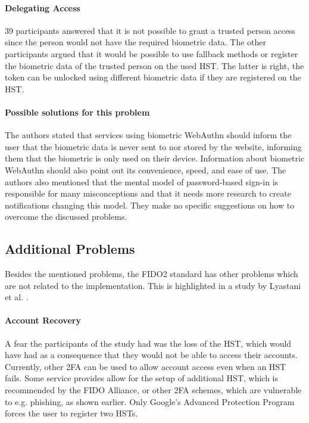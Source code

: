 \documentclass[runningheads]{llncs}
\begin{document}
\paragraph{Delegating Access}
39 participants answered that it is not possible to grant a trusted person access since the person would not have the required biometric data. The other participants argued that it would be possible to use fallback methods or register the biometric data of the trusted person on the used HST. The latter is right, the token can be unlocked using different biometric data if they are registered on the HST.

\paragraph{Possible solutions for this problem}
The authors stated that services using biometric WebAuthn should inform the user that the biometric data is never sent to nor stored by the website, informing them that the biometric is only used on their device. Information about biometric WebAuthn should also point out its convenience, speed, and ease of use. The authors also mentioned that the mental model of password-based sign-in is responsible for many misconceptions and that it needs more research to create notifications changing this model. They make no specific suggestions on how to overcome the discussed problems.

\subsection{Additional Problems} \label{ref1}
Besides the mentioned problems, the FIDO2 standard has other problems which are not related to the implementation. This is highlighted in a study by Lyastani et al. \cite{9152694}. 

\paragraph{Account Recovery}
A fear the participants of the study had was the loss of the HST, which would have had as a consequence that they would not be able to access their accounts. Currently, other 2FA can be used to allow account access even when an HST fails. Some service provides allow for the setup of additional HST, which is recommended by the FIDO Alliance, or other 2FA schemes, which are vulnerable to e.g. phishing, as shown earlier. Only Google's Advanced Protection Program forces the user to register two HSTs.
\end{document}
